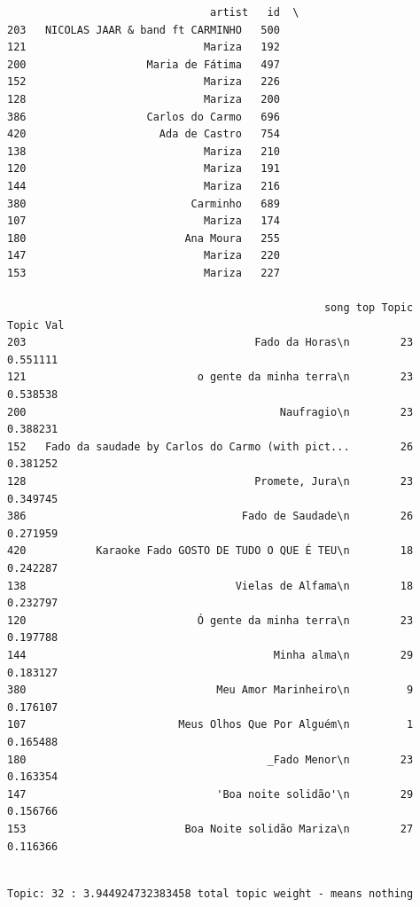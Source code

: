 \documentclass[11pt]{article}
\begin{document}
    
    \begin{verbatim}
                                artist   id  \
203   NICOLAS JAAR & band ft CARMINHO   500   
121                            Mariza   192   
200                   Maria de Fátima   497   
152                            Mariza   226   
128                            Mariza   200   
386                   Carlos do Carmo   696   
420                     Ada de Castro   754   
138                            Mariza   210   
120                            Mariza   191   
144                            Mariza   216   
380                          Carminho   689   
107                            Mariza   174   
180                         Ana Moura   255   
147                            Mariza   220   
153                            Mariza   227   

                                                  song top Topic  Topic Val  
203                                    Fado da Horas\n        23   0.551111  
121                           o gente da minha terra\n        23   0.538538  
200                                        Naufragio\n        23   0.388231  
152   Fado da saudade by Carlos do Carmo (with pict...        26   0.381252  
128                                    Promete, Jura\n        23   0.349745  
386                                  Fado de Saudade\n        26   0.271959  
420           Karaoke Fado GOSTO DE TUDO O QUE É TEU\n        18   0.242287  
138                                 Vielas de Alfama\n        18   0.232797  
120                           Ó gente da minha terra\n        23   0.197788  
144                                       Minha alma\n        29   0.183127  
380                              Meu Amor Marinheiro\n         9   0.176107  
107                        Meus Olhos Que Por Alguém\n         1   0.165488  
180                                      _Fado Menor\n        23   0.163354  
147                              'Boa noite solidão'\n        29   0.156766  
153                         Boa Noite solidão Mariza\n        27   0.116366  
    \end{verbatim}

    
    \begin{Verbatim}[commandchars=\\\{\}]

Topic: 32 : 3.944924732383458 total topic weight - means nothing

    \end{Verbatim}
\end{document}
